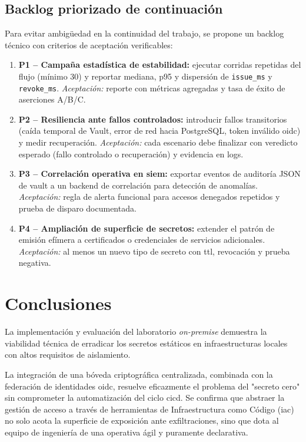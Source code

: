 \documentclass[runningheads]{llncs}
\begin{document}
\subsection{Backlog priorizado de continuación}
Para evitar ambigüedad en la continuidad del trabajo, se propone un backlog técnico con criterios de aceptación verificables:
\begin{enumerate}
    \item \textbf{P1 -- Campaña estadística de estabilidad:} ejecutar corridas repetidas del flujo (mínimo 30) y reportar mediana, p95 y dispersión de \texttt{issue\_ms} y \texttt{revoke\_ms}. \textit{Aceptación:} reporte con métricas agregadas y tasa de éxito de aserciones A/B/C.
    \item \textbf{P2 -- Resiliencia ante fallos controlados:} introducir fallos transitorios (caída temporal de Vault, error de red hacia PostgreSQL, token inválido \gls{oidc}) y medir recuperación. \textit{Aceptación:} cada escenario debe finalizar con veredicto esperado (fallo controlado o recuperación) y evidencia en logs.
    \item \textbf{P3 -- Correlación operativa en \gls{siem}:} exportar eventos de auditoría JSON de \gls{vault} a un backend de correlación para detección de anomalías. \textit{Aceptación:} regla de alerta funcional para accesos denegados repetidos y prueba de disparo documentada.
    \item \textbf{P4 -- Ampliación de superficie de secretos:} extender el patrón de emisión efímera a certificados o credenciales de servicios adicionales. \textit{Aceptación:} al menos un nuevo tipo de secreto con \gls{ttl}, revocación y prueba negativa.
\end{enumerate}

\section{Conclusiones}
La implementación y evaluación del laboratorio \textit{on-premise} demuestra la viabilidad técnica de erradicar los secretos estáticos en infraestructuras locales con altos requisitos de aislamiento.

La integración de una bóveda criptográfica centralizada, combinada con la federación de identidades \gls{oidc}, resuelve eficazmente el problema del "secreto cero" sin comprometer la automatización del ciclo \gls{cicd}. Se confirma que abstraer la gestión de acceso a través de herramientas de Infraestructura como Código (\gls{iac}) no solo acota la superficie de exposición ante exfiltraciones, sino que dota al equipo de ingeniería de una operativa ágil y puramente declarativa.
\end{document}
